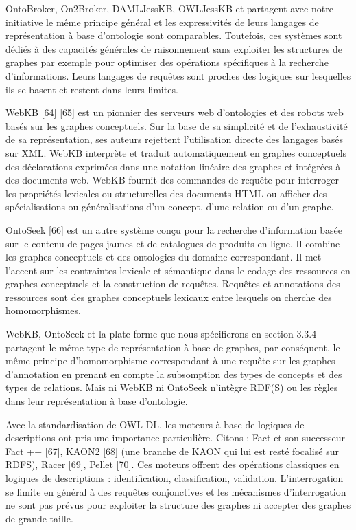OntoBroker, On2Broker, DAMLJessKB, OWLJessKB et partagent avec notre initiative le même principe général et les expressivités de leurs langages de représentation à base d’ontologie sont comparables. Toutefois, ces systèmes sont dédiés à des capacités générales de raisonnement sans exploiter les structures de graphes par exemple pour optimiser des opérations spécifiques à la recherche d'informations. Leurs langages de requêtes sont proches des logiques sur lesquelles ils se basent et restent dans leurs limites.

WebKB [64] [65] est un pionnier des serveurs web d'ontologies et des robots web basés sur les graphes conceptuels. Sur la base de sa simplicité et de l'exhaustivité de sa représentation, ses auteurs rejettent l'utilisation directe des langages basés sur XML. WebKB interprète et traduit automatiquement en graphes conceptuels des déclarations exprimées dans une notation linéaire des graphes et intégrées à des documents web. WebKB fournit des commandes de requête pour interroger les propriétés lexicales ou structurelles des documents HTML ou afficher des spécialisations ou généralisations d'un concept, d'une relation ou d'un graphe.

OntoSeek [66] est un autre système conçu pour la recherche d’information basée sur le contenu de pages jaunes et de catalogues de produits en ligne. Il combine les graphes conceptuels et des ontologies du domaine correspondant. Il met l'accent sur les contraintes lexicale et sémantique dans le codage des ressources en graphes conceptuels et la construction de requêtes. Requêtes et annotations des ressources sont des graphes conceptuels lexicaux entre lesquels on cherche des homomorphismes.

WebKB, OntoSeek et la plate-forme que nous spécifierons en section 3.3.4 partagent le même type de représentation à base de graphes, par conséquent, le même principe d’homomorphisme correspondant à une requête sur les graphes d'annotation en prenant en compte la subsomption des types de concepts et des types de relations. Mais ni WebKB ni OntoSeek n’intègre RDF(S) ou les règles dans leur représentation à base d’ontologie.

Avec la standardisation de OWL DL, les moteurs à base de logiques de descriptions ont pris une importance particulière. Citons : Fact et son successeur Fact ++ [67], KAON2 [68] (une branche de KAON qui lui est resté focalisé sur RDFS), Racer [69], Pellet [70]. Ces moteurs offrent des opérations classiques en logiques de descriptions : identification, classification, validation. L’interrogation se limite en général à des requêtes conjonctives et les mécanismes d’interrogation ne sont pas prévus pour exploiter la structure des graphes ni accepter des graphes de grande taille.


